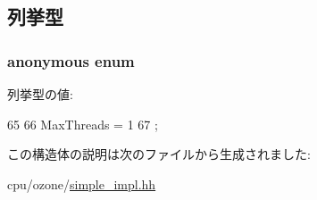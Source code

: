 \subsection{列挙型}
\hypertarget{structSimpleImpl_a1f9aebf1de3ebbf4283a4dcf73308562}{
\subsubsection[{"@37}]{\setlength{\rightskip}{0pt plus 5cm}anonymous enum}}
\label{structSimpleImpl_a1f9aebf1de3ebbf4283a4dcf73308562}
\begin{Desc}
\item[列挙型の値: ]\par
\begin{description}
\item[{\em 
\hypertarget{structSimpleImpl_a1f9aebf1de3ebbf4283a4dcf73308562ab491ddc45d51d0ea7f735c1926390fdb}{
MaxThreads}
\label{structSimpleImpl_a1f9aebf1de3ebbf4283a4dcf73308562ab491ddc45d51d0ea7f735c1926390fdb}
}]\end{description}
\end{Desc}




\begin{DoxyCode}
65          {
66         MaxThreads = 1
67     };
\end{DoxyCode}


この構造体の説明は次のファイルから生成されました:\begin{DoxyCompactItemize}
\item 
cpu/ozone/\hyperlink{simple__impl_8hh}{simple\_\-impl.hh}\end{DoxyCompactItemize}
